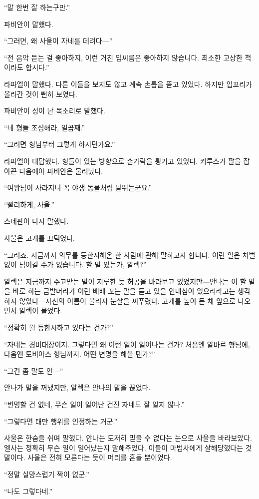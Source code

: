 ``말 한번 잘 하는구만.''

파비안이 말했다.

``그러면, 왜 사울이 자네를 데려다—''

``전 음악 듣는 걸 좋아하지, 이런 거친 입씨름은 좋아하지 않습니다. 최소한 고상한 척이라도 합시다.''

라파엘이 말했다. 다른 이들을 보지도 않고 계속 손톱을 뜯고 있었다. 하지만 입꼬리가 올라간 것이 뻔히 보였다.

파비안이 성이 난 목소리로 말했다.

``네 형들 조심해라, 일곱째.''

``그러면 형님부터 그렇게 하시던가요.''

라파엘이 대답했다. 형들이 있는 방향으로 손가락을 튕기고 있었다. 키루스가 팔을 잡아끈 다음에야 파비안은 물러났다.

``여왕님이 사라지니 꼭 야생 동물처럼 날뛰는군요.''

``빨리하게, 사울.''

스테판이 다시 말했다.

사울은 고개를 끄덕였다.

``그러죠. 지금까지 의무를 등한시해온 한 사람에 관해 말하고자 합니다. 이런 일은 처벌 없이 넘어갈 수가 없습니다. 할 말 있는가, 알렉?''

알렉은 지금까지 주고받는 말이 지루한 듯 허공을 바라보고 있었지만—안나는 이 할 말을 바로 하는 금발머리가 이런 배배 꼬는 말을 듣고 있을 인내심이 있으리라고는 생각하지 않았다—자신의 이름이 불리자 눈살을 찌푸렸다. 고개를 높이 든 채 앞으로 나오면서 알렉이 물었다.

``정확히 뭘 등한시하고 있다는 건가?''

``자네는 경비대장이지. 그렇다면 왜 이런 일이 일어나는 건가? 처음엔 알바르 형님에, 다음엔 토비아스 형님까지. 어떤 변명을 해볼 텐가?''

``그건 좀 말도 안—''

안나가 말을 꺼냈지만, 알렉은 안나의 말을 끊었다.

``변명할 건 없네, 무슨 일이 일어난 건진 자네도 잘 알지 않나.''

``그렇다면 태만 행위를 인정하는 거군.''

사울은 한숨을 쉬며 말했다. 안나는 도저히 믿을 수 없다는 눈으로 사울을 바라보았다. 엘사는 정확히 무슨 일이 일어났는지 말해주었다. 이들이 마법사에게 살해당했다는 것 말이다. 사울은 전혀 모른다는 듯이 머리를 흔들 뿐이었다.

``정말 실망스럽기 짝이 없군.''

``나도 그렇다네.''

